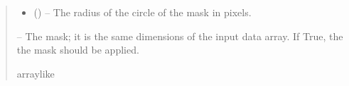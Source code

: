 \documentclass[letterpaper,11pt,english]{sphinxmanual}
\begin{document}
\begin{savenotes}
\begin{fulllineitems}
\begin{quote}
\begin{description}
\begin{itemize}
\item {} 
\sphinxAtStartPar
{} () – The radius of the circle of the mask in pixels.

\end{itemize}

\sphinxAtStartPar
{} – The mask; it is the same dimensions of the input data array. If True,
the the mask should be applied.

\sphinxAtStartPar
array\sphinxhyphen{}like

\end{description}\end{quote}

\end{fulllineitems}\end{savenotes}

\end{document}
